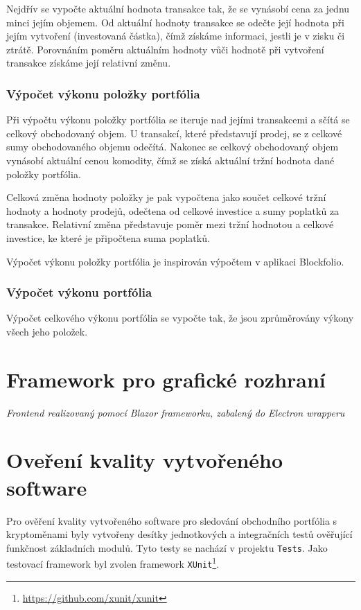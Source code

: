 \documentclass[12pt, a4paper]{article}
\begin{document}
    Nejdřív se vypočte aktuální hodnota transakce tak, že se vynásobí cena za jednu minci jejím objemem.
    Od aktuální hodnoty transakce se odečte její hodnota při jejím vytvoření (investovaná částka), čímž získáme informaci, jestli je v zisku či ztrátě.
    Porovnáním poměru aktuálním hodnoty vůči hodnotě při vytvoření transakce získáme její relativní změnu.
    
    \subsubsection{Výpočet výkonu položky portfólia}
    Při výpočtu výkonu položky portfólia se iteruje nad jejími transakcemi a sčítá se celkový obchodovaný objem.
    U transakcí, které představují prodej, se z celkové sumy obchodovaného objemu odečítá.
    Nakonec se celkový obchodovaný objem vynásobí aktuální cenou komodity, čímž se získá aktuální tržní hodnota dané položky portfólia.
    
    Celková změna hodnoty položky je pak vypočtena jako součet celkové tržní hodnoty a hodnoty prodejů, odečtena od celkové investice a sumy poplatků za transakce. 
    Relativní změna představuje poměr mezi tržní hodnotou a celkové investice, ke které je připočtena suma poplatků.
    
    Výpočet výkonu položky portfólia je inspirován výpočtem v aplikaci Blockfolio.
    
    \subsubsection{Výpočet výkonu portfólia}
    Výpočet celkového výkonu portfólia se vypočte tak, že jsou zprůměrovány výkony všech jeho položek.
    
    \section{Framework pro grafické rozhraní}
    \textit{Frontend realizovaný pomocí Blazor frameworku, zabalený do Electron wrapperu}


    \section{Oveření kvality vytvořeného software}

    Pro ověření kvality vytvořeného software pro sledování obchodního portfólia s kryptoměnami byly vytvořeny desítky jednotkových a integračních testů ověřující funkčnost základních modulů. Tyto testy se nachází v projektu \texttt{Tests}. Jako testovací framework byl zvolen framework \texttt{XUnit}\footnote{\url{https://github.com/xunit/xunit}}.
\end{document}

